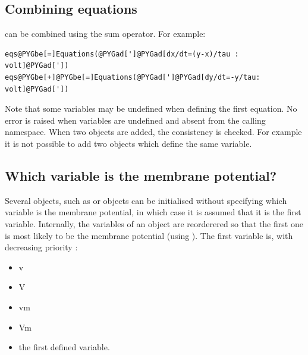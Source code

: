 \documentclass[letterpaper,10pt,english]{manual}
\begin{document}
\subsection{Combining equations}

\hyperlink{brian.Equations}{} can be combined using the sum operator. For example:

\begin{Verbatim}[commandchars=@\[\]]
eqs@PYGbe[=]Equations(@PYGad[']@PYGad[dx/dt=(y-x)/tau : volt]@PYGad['])
eqs@PYGbe[+]@PYGbe[=]Equations(@PYGad[']@PYGad[dy/dt=-y/tau: volt]@PYGad['])
\end{Verbatim}

Note that some variables may be undefined when defining the first equation. No error is
raised when variables are undefined and absent from the calling namespace.
When two \hyperlink{brian.Equations}{} objects are added, the consistency is checked. For example it is not
possible to add two \hyperlink{brian.Equations}{} objects which define the same variable.

\subsection{Which variable is the membrane potential?}

Several objects, such as \hyperlink{brian.Threshold}{} or \hyperlink{brian.Reset}{} objects
can be initialised without specifying which variable is the membrane potential, in which
case it is assumed that it is the first variable.
Internally, the variables of an \hyperlink{brian.Equations}{} object are reorderered so that the first one
is most likely to be the membrane potential (using ).
The first variable is, with decreasing priority :
\begin{itemize}
\item {} 
v

\item {} 
V

\item {} 
vm

\item {} 
Vm

\item {} 
the first defined variable.

\end{itemize}
\hypertarget{numerical-integration}{}
\end{document}
